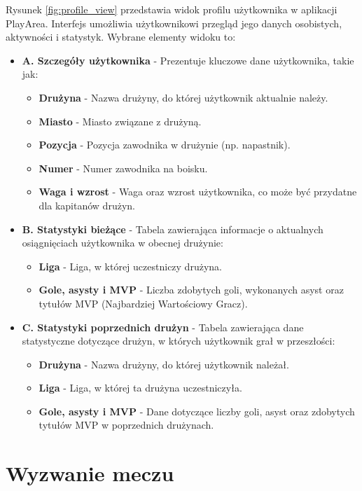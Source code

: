 \documentclass[wmii,inf,inz]{uwmthesis} %
\begin{document}
\noindent
Rysunek \ref{fig:profile_view} przedstawia widok profilu użytkownika w aplikacji PlayArea. Interfejs umożliwia użytkownikowi przegląd jego danych osobistych, aktywności i statystyk. Wybrane elementy widoku to:
\begin{itemize}
    \item \textbf{A. Szczegóły użytkownika} - Prezentuje kluczowe dane użytkownika, takie jak:
    \begin{itemize}[label=$\cdot$]
        \item \textbf{Drużyna} - Nazwa drużyny, do której użytkownik aktualnie należy.
        \item \textbf{Miasto} - Miasto związane z drużyną.
        \item \textbf{Pozycja} - Pozycja zawodnika w drużynie (np. napastnik).
        \item \textbf{Numer} - Numer zawodnika na boisku.
        \item \textbf{Waga i wzrost} - Waga oraz wzrost użytkownika, co może być przydatne dla kapitanów drużyn.
    \end{itemize}
    \item \textbf{B. Statystyki bieżące} - Tabela zawierająca informacje o aktualnych osiągnięciach użytkownika w obecnej drużynie:
    \begin{itemize}[label=$\cdot$]
        \item \textbf{Liga} - Liga, w której uczestniczy drużyna.
        \item \textbf{Gole, asysty i MVP} - Liczba zdobytych goli, wykonanych asyst oraz tytułów MVP (Najbardziej Wartościowy Gracz).
    \end{itemize}
    \item \textbf{C. Statystyki poprzednich drużyn} - Tabela zawierająca dane statystyczne dotyczące drużyn, w których użytkownik grał w przeszłości:
    \begin{itemize}[label=$\cdot$]
        \item \textbf{Drużyna} - Nazwa drużyny, do której użytkownik należał.
        \item \textbf{Liga} - Liga, w której ta drużyna uczestniczyła.
        \item \textbf{Gole, asysty i MVP} - Dane dotyczące liczby goli, asyst oraz zdobytych tytułów MVP w poprzednich drużynach.
    \end{itemize}
\end{itemize}
\section{Wyzwanie meczu}
\end{document}
